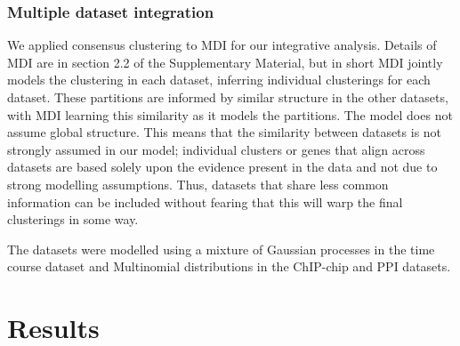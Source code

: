 \documentclass{bmcart}
\begin{document}
	\subsubsection*{Multiple dataset integration}
	We applied consensus clustering to MDI for our integrative analysis. Details of MDI are in section 2.2 of the Supplementary Material, but in short MDI jointly models the clustering in each dataset, inferring individual clusterings for each dataset. These partitions are informed by similar structure in the other datasets, with MDI learning this similarity as it models the partitions. The model does not assume global structure. This means that the similarity between datasets is not strongly assumed in our model; individual clusters or genes that align across datasets are based solely upon the evidence present in the data and not due to strong modelling assumptions. Thus, datasets that share less common information can be included without fearing that this will warp the final clusterings in some way.
	
	The datasets were modelled using a mixture of Gaussian processes in the time course dataset and Multinomial distributions in the ChIP-chip and PPI datasets.
		
	\section*{Results}
\end{document}
